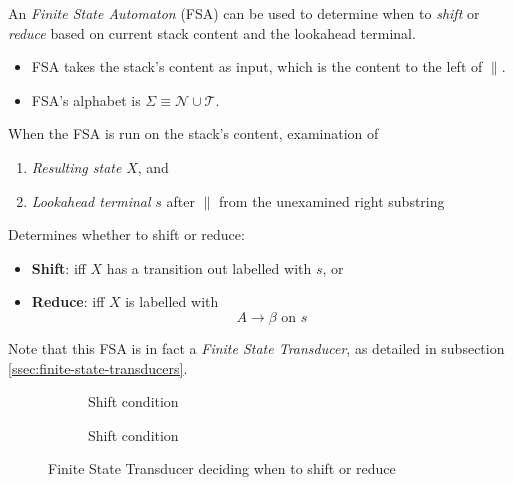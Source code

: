 \begin{definition}
    An \textit{Finite State Automaton} (FSA) can be used to determine when to \textit{shift} or \textit{reduce} based on current stack content and the lookahead terminal.
    \begin{itemize}
        \item FSA takes the stack's content as input, which is the content to the left of $\parallel$.
        \item FSA's alphabet is $\Sigma \equiv \mathcal{N} \cup \mathcal{T}$.
    \end{itemize}
    
    When the FSA is run on the stack's content, examination of
    \begin{enumerate}
        \item \textit{Resulting state} $X$, and
        \item \textit{Lookahead terminal} $s$ after $\parallel$ from the unexamined right substring
    \end{enumerate}
    
    Determines whether to shift or reduce:
    \begin{itemize}
        \item \textbf{Shift}: iff $X$ has a transition out labelled with $s$, or
        \item \textbf{Reduce}: iff $X$ is labelled with
        \begin{equation}
            A \to \beta \text{\ on\ } s
        \end{equation}
    \end{itemize}
    
    Note that this FSA is in fact a \textit{Finite State Transducer}, as detailed in subsection \ref{ssec:finite-state-transducers}.
    
    \begin{figure}[H]
        \centering
        \begin{subfigure}{0.45\textwidth}
            \centering
            \caption{Shift condition}
        \end{subfigure}
        \begin{subfigure}{0.45\textwidth}
            \centering
            \caption{Shift condition}
        \end{subfigure}
        \caption{Finite State Transducer deciding when to shift or reduce}
        \label{fig:shift-reduce-decision-fst}
    \end{figure}
\end{definition}

